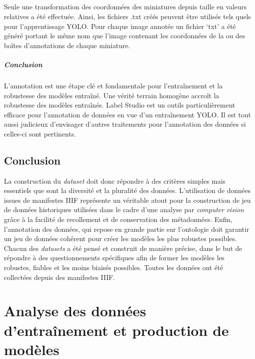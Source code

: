 \documentclass[12pt,twoside]{book}
\begin{document}
\paragraph{}
 Seule une transformation des coordonnées des miniatures depuis {taille} en valeurs relatives a été effectuée. Ainsi, les fichiers .txt créés peuvent être utilisés tels quels pour l’apprentissage YOLO. Pour chaque image annotée un fichier ‘txt’ a été généré portant le même nom que l’image contenant les coordonnées de la ou des boîtes d’annotations de chaque miniature. \\

 \paragraph{Conclusion}L’annotation est une étape clé et fondamentale pour l’entraînement et la robustesse des modèles entraîné. Une vérité terrain homogène accroît la robustesse des modèles entraînés. Label Studio est un outils particulièrement efficace pour l'annotation de données en vue d'un entraînement YOLO. Il est tout aussi judicieux d'envisager d'autres traitements pour l'annotation des données si celles-ci sont pertinents.

 \section{Conclusion}

La construction du \textit{dataset} doit donc répondre à des critères simples mais essentiels que sont la diversité et la pluralité des données. L’utilisation de données issues de manifestes IIIF représente un véritable atout pour la construction de jeu de données historiques utilisées dans le cadre d’une analyse par \textit{computer vision} grâce à la facilité de recollement et de conservation des métadonnées. Enfin, l’annotation des données, qui repose en grande partie sur l’ontologie doit garantir un jeu de données cohérent pour créer les modèles les plus robustes possibles. Chacun des \textit{datasets} a été pensé et construit de manière précise, dans le but de répondre à des questionnements spécifiques afin de former les modèles les robustes, fiables et les moins biaisés possibles. Toutes les données ont été collectées depuis des manifestes IIIF.

 \chapter{Analyse des données d'entraînement et production de modèles}
\end{document}
